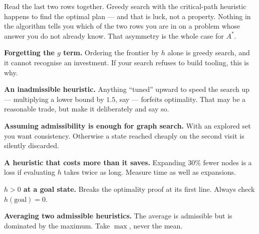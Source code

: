 Read the last two rows together. Greedy search with the critical-path heuristic
happens to find the optimal plan --- and that is luck, not a property. Nothing in
the algorithm tells you which of the two rows you are in on a problem whose answer
you do not already know. That asymmetry is the whole case for $A^{*}$.

\begin{pitfall}
\begin{tight}
  \item \textbf{Forgetting the $g$ term.} Ordering the frontier by $h$ alone is
        greedy search, and it cannot recognise an investment. If your search refuses
        to build tooling, this is why.
  \item \textbf{An inadmissible heuristic.} Anything ``tuned'' upward to speed the
        search up --- multiplying a lower bound by $1.5$, say --- forfeits
        optimality. That may be a reasonable trade, but make it deliberately and
        say so.
  \item \textbf{Assuming admissibility is enough for graph search.} With an explored
        set you want consistency. Otherwise a state reached cheaply on the second
        visit is silently discarded.
  \item \textbf{A heuristic that costs more than it saves.} Expanding $30\%$ fewer
        nodes is a loss if evaluating $h$ takes twice as long. Measure time as well
        as expansions.
  \item \textbf{$h > 0$ at a goal state.} Breaks the optimality proof at its first
        line. Always check $h(\text{goal}) = 0$.
  \item \textbf{Averaging two admissible heuristics.} The average is admissible but
        is dominated by the maximum. Take $\max$, never the mean.
\end{tight}
\end{pitfall}

